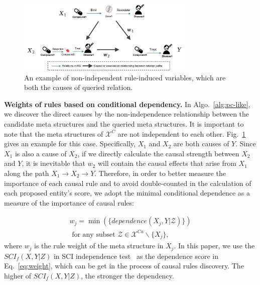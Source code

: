 \begin{figure}[t]
\vspace{0cm}
\centering
\includegraphics[width=8.5cm]{submissions/causal-meta-knowledge/figures/direct_cause.jpg}
\caption{An example of non-independent rule-induced variables, which are both the causes of queried relation.}
\label{fig:direct_cause_example}
\end{figure}

\noindent
\textbf{Weights of rules based on conditional dependency.}
In Algo.~\ref{alg:pc-like}, we discover the direct causes by the non-independence relationship between the candidate meta structures and the queried meta structures.
It is important to note that the meta structures of $\mathcal{X}^C$ are not independent to each other.
Fig.~\ref{fig:direct_cause_example} gives an example for this case. Specifically, $X_1$ and $X_2$ are both causes of $Y$.
Since $X_1$ is also a cause of $X_2$, if we directly calculate the causal strength between $X_2$ and $Y$, it is inevitable that $w_2$ will contain the causal effects that arise from $X_1$ along the path $X_1\to X_2 \to Y$.
Therefore, in order to better measure the importance of each causal rule and to avoid double-counted in the calculation of each proposed entity's score, we adopt the minimal conditional dependence as a measure of the importance of causal rules:

\begin{equation}
\label{eq:weight}
\begin{aligned}
w_j  = \min(\{ dependence(X_j,Y|\mathcal{Z}) \})
\\
\text{~for any subset~} \mathcal{Z} \in \mathcal{X}^{Ca}\backslash \{X_j\},
\end{aligned}
\end{equation}
where $w_j$  is the rule weight of the meta structure in $X_j$.
In this paper, we use the $SCI_f(X,Y|Z)$ in SCI independence test~\cite{marx2019testing} as the dependence score in Eq.~\ref{eq:weight}, which can be get in the process of causal rules discovery.
The higher of $SCI_f(X,Y|Z)$, the stronger the dependency.

